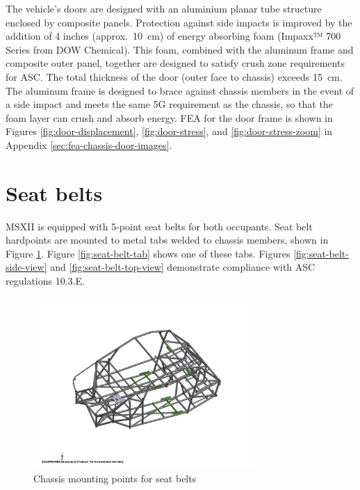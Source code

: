 \documentclass[10pt]{article}
\begin{document}
The vehicle's doors are designed with an aluminium planar tube structure enclosed by composite panels. Protection against side impacts is improved by the addition of 4 inches (approx.\ \SI{10}{\centi\meter}) of energy absorbing foam (Impaxx™ 700 Series from DOW Chemical). This foam, combined with the aluminum frame and composite outer panel, together are designed to satisfy crush zone requirements for ASC. The total thickness of the door (outer face to chassis) exceeds \SI{15}{\centi\meter}. The aluminum frame is designed to brace against chassis members in the event of a side impact and meets the same 5G requirement as the chassis, so that the foam layer can crush and absorb energy. FEA for the door frame is shown in Figures \ref{fig:door-displacement}, \ref{fig:door-stress}, and \ref{fig:door-stress-zoom} in Appendix \ref{sec:fea-chassis-door-images}.

\section{Seat belts}
MSXII is equipped with 5-point seat belts for both occupants. Seat belt hardpoints are mounted to metal tabs welded to chassis members, shown in Figure \ref{fig:seat-belt-tab-positions}. Figure \ref{fig:seat-belt-tab} shows one of these tabs. Figures \ref{fig:seat-belt-side-view} and \ref{fig:seat-belt-top-view} demonstrate compliance with ASC regulations 10.3.E.

\begin{figure}[H]
\centering
\includegraphics[width=0.75\textwidth]{figures/seat-belt-tab-positions}
\caption{Chassis mounting points for seat belts}
\label{fig:seat-belt-tab-positions}
\end{figure}
\end{document}
